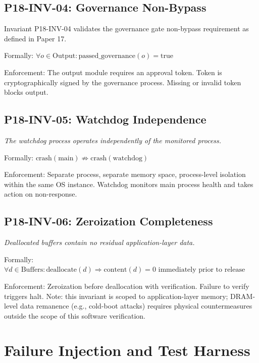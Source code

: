 \documentclass[conference]{IEEEtran}
\begin{document}
\subsection{P18-INV-04: Governance Non-Bypass}
Invariant P18-INV-04 validates the governance gate non-bypass requirement as defined in Paper 17.

Formally: $\forall o \in \text{Output}: \text{passed\_governance}(o) = \text{true}$

Enforcement: The output module requires an approval token. Token is cryptographically signed by the governance process. Missing or invalid token blocks output.

\subsection{P18-INV-05: Watchdog Independence}
\textit{The watchdog process operates independently of the monitored process.}

Formally: $\text{crash}(\text{main}) \not\Rightarrow \text{crash}(\text{watchdog})$

Enforcement: Separate process, separate memory space, process-level isolation within the same OS instance. Watchdog monitors main process health and takes action on non-response.

\subsection{P18-INV-06: Zeroization Completeness}
\textit{Deallocated buffers contain no residual application-layer data.}

Formally: $\forall d \in \text{Buffers}: \text{deallocate}(d) \Rightarrow \text{content}(d) = 0 \text{ immediately prior to release}$

Enforcement: Zeroization before deallocation with verification. Failure to verify triggers halt. Note: this invariant is scoped to application-layer memory; DRAM-level data remanence (e.g., cold-boot attacks) requires physical countermeasures outside the scope of this software verification.

\section{Failure Injection and Test Harness}
\end{document}
